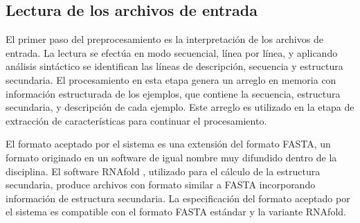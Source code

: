 %
%
\subsection{Lectura de los archivos de entrada}
%
El primer paso del preprocesamiento es la interpretación de los
archivos de entrada.
La lectura se efectúa en modo secuencial, línea por línea, y aplicando
análisis sintáctico se identifican las líneas de descripción,
secuencia y estructura secundaria.
El procesamiento en esta etapa genera un arreglo en memoria con
información estructurada de los ejemplos, que contiene la secuencia,
estructura secundaria, y descripción de cada ejemplo.
Este arreglo es utilizado en la etapa de extracción de características
para continuar el procesamiento.

El formato aceptado por el sistema es una extensión del formato FASTA,
un formato originado en un software de igual nombre \cite{fasta} muy
difundido dentro de la disciplina.
El software RNAfold \cite{vienna}, utilizado para el cálculo de la
estructura secundaria, produce archivos con formato similar a FASTA
incorporando información de estructura secundaria.
La especificación del formato aceptado por el sistema es compatible
con el formato FASTA estándar y la variante RNAfold.

